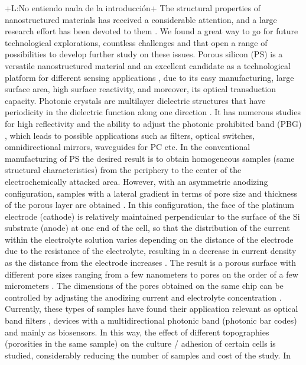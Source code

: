 \documentclass{article}
\newcommand{\notaL}[1]{{\color{blue}+L:#1+}}
\begin{document}
\notaL{No entiendo nada de la introducción}
The structural properties of nanostructured materials  has  received a
considerable attention,  and a large research effort has been devoted
to them \cite{I1}. We found a great way to go for future
technological  explorations,  countless  challenges and  that  open a
range of possibilities to develop further  study  on these
issues\cite{I2}. Porous silicon (PS) is a versatile nanostructured
material and an excellent candidate as a technological platform for
different sensing applications \cite{I3, I4}, due to its easy
manufacturing,  large surface area, high surface reactivity,  and
moreover, its optical transduction capacity.  Photonic crystals are
multilayer dielectric structures that have periodicity in the
dielectric function along one direction \cite{I5}. It has numerous
studies for high reflectivity and the ability to adjust  the photonic
prohibited  band (PBG)\cite{I6} , which leads to possible applications
such as filters\cite{I7}, optical switches\cite{I8}, omnidirectional
mirrors\cite{I9}, waveguides for PC \cite{I10} etc. In the
conventional manufacturing of PS the desired result  is to obtain
homogeneous samples (same structural characteristics) from the
periphery  to the center  of the electrochemically  attacked area.
However, with an asymmetric anodizing configuration,  samples with a
lateral gradient in terms of pore size and thickness of the porous
layer are obtained \cite{I101}. In this configuration,  the face of
the platinum  electrode (cathode)  is relatively maintained
perpendicular  to the surface of the Si substrate (anode) at one end
of the cell, so that the distribution of the current within the
electrolyte  solution varies depending on the distance  of the
electrode due to the resistance of the electrolyte,  resulting  in a
decrease in current density as the distance from the electrode
increases \cite{I102, I103}. The result is a porous surface with
different pore sizes ranging from a few nanometers  to pores on the
order of a few micrometers  \cite{I104}. The dimensions of the pores
obtained on the same chip can be controlled by adjusting the anodizing
current and electrolyte concentration \cite{I11}. Currently, these
types of samples have found their application relevant as optical band
filters \cite{I12}, devices with a multidirectional photonic band
(photonic bar codes) \cite{I13} and mainly as biosensors. In this way,
the effect of different topographies (porosities in the same sample)
on the culture / adhesion of certain cells \cite{I14} is studied,
considerably reducing the number of samples and cost of the study. In
\end{document}
